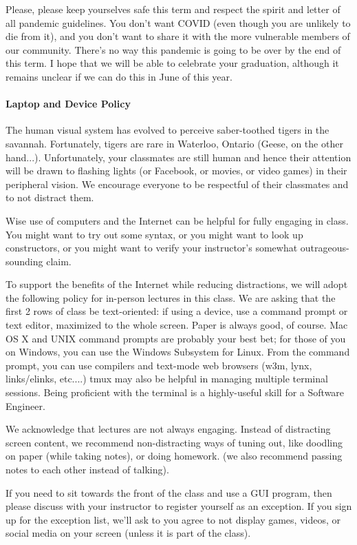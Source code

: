Please, please keep yourselves safe this term and respect the spirit and letter of all pandemic guidelines. You don't want COVID (even though you are unlikely to die from it), and you don't want to share it with the more vulnerable members of our community. There's no way this pandemic is going to be over by the end of this term. I hope that we will be able to celebrate your graduation, although it remains unclear if we can do this in June of this year. 

\paragraph{Laptop and Device Policy}
The human visual system has evolved to perceive saber-toothed tigers
in the savannah. Fortunately, tigers are rare in Waterloo, Ontario
(Geese, on the other hand...).
Unfortunately, your classmates are still human and hence their
attention will be drawn to flashing lights (or Facebook, or movies, or
video games) in their peripheral vision. We encourage
everyone to be respectful of their classmates and to not distract them.

Wise use of computers and the Internet can be helpful for fully
engaging in class. You might want to try out some syntax, or you might
want to look up constructors, or you might want to verify your
instructor's somewhat outrageous-sounding claim.

To support the benefits of the Internet while reducing distractions,
we will adopt the following policy for in-person lectures in this class. We are asking that the
first 2 rows of class be text-oriented: if using a device, use a
command prompt or text editor, maximized to the whole screen. Paper is
always good, of course. Mac OS X and UNIX command prompts are probably
your best bet; for those of you on Windows, you can use the Windows
Subsystem for Linux. From the command prompt, you can use compilers
and text-mode web browsers (w3m, lynx, links/elinks, etc....) tmux may
also be helpful in managing multiple terminal sessions. Being
proficient with the terminal is a highly-useful skill for a Software
Engineer.

We acknowledge that lectures are not always engaging. Instead of
distracting screen content, we recommend non-distracting ways of tuning
out, like doodling on paper (while taking notes), or doing homework.
(we also recommend passing notes to each other instead of talking).

If you need to sit towards the front of the class and use a GUI
program, then please discuss with your instructor to register
yourself as an exception. If you sign up for
the exception list, we'll ask to you agree to not display games,
videos, or social media on your screen (unless it is part of the
class).

